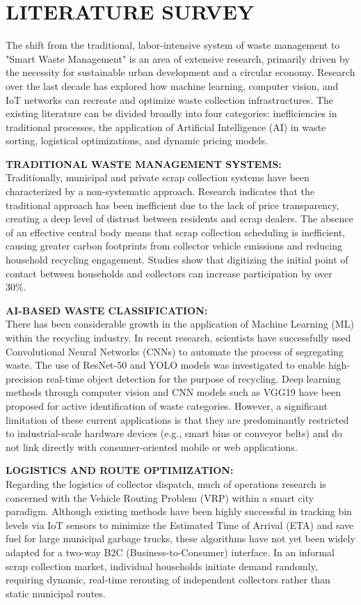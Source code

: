 \chapter{LITERATURE SURVEY}

The shift from the traditional, labor-intensive system of waste management to "Smart Waste Management" is an area of extensive research, primarily driven by the necessity for sustainable urban development and a circular economy. Research over the last decade has explored how machine learning, computer vision, and IoT networks can recreate and optimize waste collection infrastructures. The existing literature can be divided broadly into four categories: inefficiencies in traditional processes, the application of Artificial Intelligence (AI) in waste sorting, logistical optimizations, and dynamic pricing models.

\textbf{TRADITIONAL WASTE MANAGEMENT SYSTEMS:}\\
Traditionally, municipal and private scrap collection systems have been characterized by a non-systematic approach. Research indicates that the traditional approach has been inefficient due to the lack of price transparency, creating a deep level of distrust between residents and scrap dealers. The absence of an effective central body means that scrap collection scheduling is inefficient, causing greater carbon footprints from collector vehicle emissions and reducing household recycling engagement. Studies show that digitizing the initial point of contact between households and collectors can increase participation by over 30\%.

\textbf{AI-BASED WASTE CLASSIFICATION:}\\
There has been considerable growth in the application of Machine Learning (ML) within the recycling industry. In recent research, scientists have successfully used Convolutional Neural Networks (CNNs) to automate the process of segregating waste. The use of ResNet-50 and YOLO models was investigated to enable high-precision real-time object detection for the purpose of recycling. Deep learning methods through computer vision and CNN models such as VGG19 have been proposed for active identification of waste categories. However, a significant limitation of these current applications is that they are predominantly restricted to industrial-scale hardware devices (e.g., smart bins or conveyor belts) and do not link directly with consumer-oriented mobile or web applications.

\textbf{LOGISTICS AND ROUTE OPTIMIZATION:}\\
Regarding the logistics of collector dispatch, much of operations research is concerned with the Vehicle Routing Problem (VRP) within a smart city paradigm. Although existing methods have been highly successful in tracking bin levels via IoT sensors to minimize the Estimated Time of Arrival (ETA) and save fuel for large municipal garbage trucks, these algorithms have not yet been widely adapted for a two-way B2C (Business-to-Consumer) interface. In an informal scrap collection market, individual households initiate demand randomly, requiring dynamic, real-time rerouting of independent collectors rather than static municipal routes.

